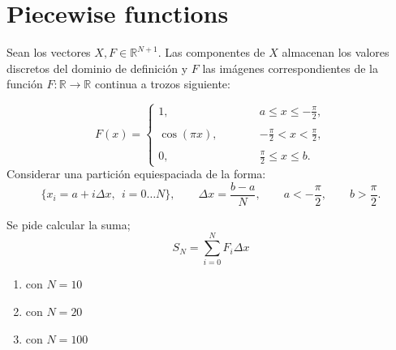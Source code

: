    
   
   
   \section{Piecewise functions  \label{funciones} }
   
   
   Sean los vectores $X,F  \in \mathbb{R}^{N + 1}$. Las componentes de  $X$ almacenan los valores
   discretos del dominio de definición y  $F$ las imágenes correspondientes
   de la función $F : \mathbb{R} \rightarrow \mathbb{R}$ continua a trozos siguiente:
   
   $$
   F (x) =
   \left\{
   \begin{array}{ll}
   \displaystyle                          
   1 , \hspace{1cm} \hspace{2cm} &  \displaystyle  a \leq x \leq - \frac{\pi}{2},      \\ \\
   \displaystyle                                                            
   \cos{(\pi x)} ,  & \displaystyle - \frac{\pi}{2} < x <  \frac{\pi}{2}, \\ \\
   \displaystyle                                                            
   0 ,              & \displaystyle  \frac{\pi}{2} \leq x \leq b.                                                                                                
   \end{array}                                                                   
   \right.                                                     
   $$ 
   Considerar una partición equiespaciada de la forma:
   $$ \{ x_i = a + i \Delta x, \ \ i = 0 \ldots  N \}, \qquad 
   \displaystyle \Delta x = \frac{b - a}{N}, \qquad a < - \frac{\pi}{2},  
   \qquad b > \frac{\pi}{2}. $$
   
   Se pide calcular la suma; 
   $$
   S_N = \sum _{i=0} ^{N} F_i \Delta x 
   $$
   \begin{enumerate} 
    \item con $ N = 10 $ 
    \item con $ N = 20 $ 
    \item con $ N = 100 $
   \end{enumerate}     
   
   
   
   
